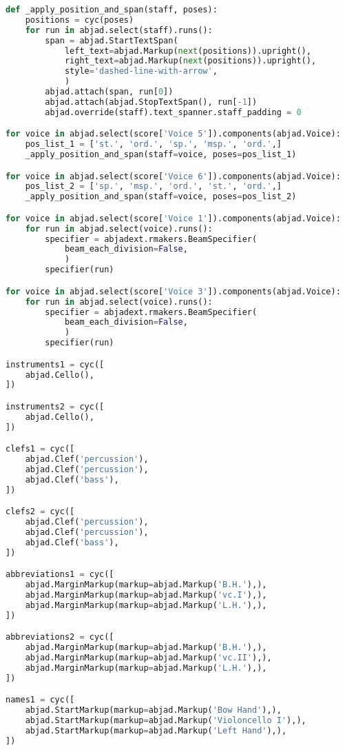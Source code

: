 \begin{lstlisting}[language=Python, caption=Cthar Segment\_I]
def _apply_position_and_span(staff, poses):
    positions = cyc(poses)
    for run in abjad.select(staff).runs():
        span = abjad.StartTextSpan(
            left_text=abjad.Markup(next(positions)).upright(),
            right_text=abjad.Markup(next(positions)).upright(),
            style='dashed-line-with-arrow',
            )
        abjad.attach(span, run[0])
        abjad.attach(abjad.StopTextSpan(), run[-1])
        abjad.override(staff).text_spanner.staff_padding = 0

for voice in abjad.select(score['Voice 5']).components(abjad.Voice):
    pos_list_1 = ['st.', 'ord.', 'sp.', 'msp.', 'ord.',]
    _apply_position_and_span(staff=voice, poses=pos_list_1)

for voice in abjad.select(score['Voice 6']).components(abjad.Voice):
    pos_list_2 = ['sp.', 'msp.', 'ord.', 'st.', 'ord.',]
    _apply_position_and_span(staff=voice, poses=pos_list_2)

for voice in abjad.select(score['Voice 1']).components(abjad.Voice):
    for run in abjad.select(voice).runs():
        specifier = abjadext.rmakers.BeamSpecifier(
            beam_each_division=False,
            )
        specifier(run)

for voice in abjad.select(score['Voice 3']).components(abjad.Voice):
    for run in abjad.select(voice).runs():
        specifier = abjadext.rmakers.BeamSpecifier(
            beam_each_division=False,
            )
        specifier(run)

instruments1 = cyc([
    abjad.Cello(),
])

instruments2 = cyc([
    abjad.Cello(),
])

clefs1 = cyc([
    abjad.Clef('percussion'),
    abjad.Clef('percussion'),
    abjad.Clef('bass'),
])

clefs2 = cyc([
    abjad.Clef('percussion'),
    abjad.Clef('percussion'),
    abjad.Clef('bass'),
])

abbreviations1 = cyc([
    abjad.MarginMarkup(markup=abjad.Markup('B.H.'),),
    abjad.MarginMarkup(markup=abjad.Markup('vc.I'),),
    abjad.MarginMarkup(markup=abjad.Markup('L.H.'),),
])

abbreviations2 = cyc([
    abjad.MarginMarkup(markup=abjad.Markup('B.H.'),),
    abjad.MarginMarkup(markup=abjad.Markup('vc.II'),),
    abjad.MarginMarkup(markup=abjad.Markup('L.H.'),),
])

names1 = cyc([
    abjad.StartMarkup(markup=abjad.Markup('Bow Hand'),),
    abjad.StartMarkup(markup=abjad.Markup('Violoncello I'),),
    abjad.StartMarkup(markup=abjad.Markup('Left Hand'),),
])


\end{lstlisting}
